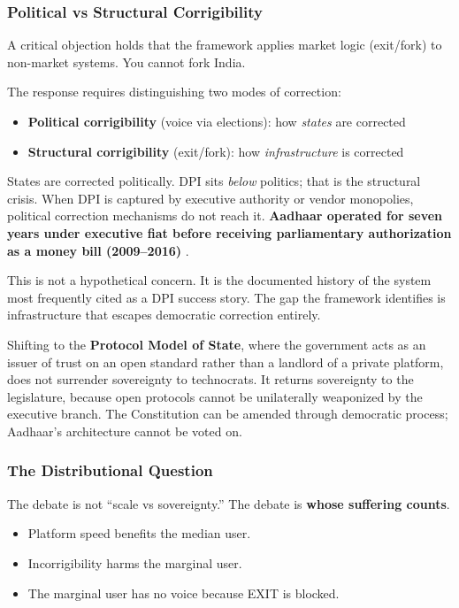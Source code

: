 \documentclass{article}
\begin{document}
\subsubsection{Political vs Structural Corrigibility}
\label{subsec:political-structural}

A critical objection holds that the framework applies market logic (exit/fork) to non-market systems. You cannot fork India.

The response requires distinguishing two modes of correction:

\begin{itemize}
    \item \textbf{Political corrigibility} (voice via elections): how \textit{states} are corrected
    \item \textbf{Structural corrigibility} (exit/fork): how \textit{infrastructure} is corrected
\end{itemize}

States are corrected politically. DPI sits \textit{below} politics; that is the structural crisis. When DPI is captured by executive authority or vendor monopolies, political correction mechanisms do not reach it. \textbf{Aadhaar operated for seven years under executive fiat before receiving parliamentary authorization as a money bill (2009--2016)} \citep{abraham2016, bhatia2019}.

This is not a hypothetical concern. It is the documented history of the system most frequently cited as a DPI success story. The gap the framework identifies is infrastructure that escapes democratic correction entirely.

Shifting to the \textbf{Protocol Model of State}, where the government acts as an issuer of trust on an open standard rather than a landlord of a private platform, does not surrender sovereignty to technocrats. It returns sovereignty to the legislature, because open protocols cannot be unilaterally weaponized by the executive branch. The Constitution can be amended through democratic process; Aadhaar's architecture cannot be voted on.

\subsubsection{The Distributional Question}
\label{subsec:distributional}

The debate is not ``scale vs sovereignty.'' The debate is \textbf{whose suffering counts}.

\begin{itemize}
    \item Platform speed benefits the median user.
    \item Incorrigibility harms the marginal user.
    \item The marginal user has no voice because EXIT is blocked.
\end{itemize}
\end{document}
